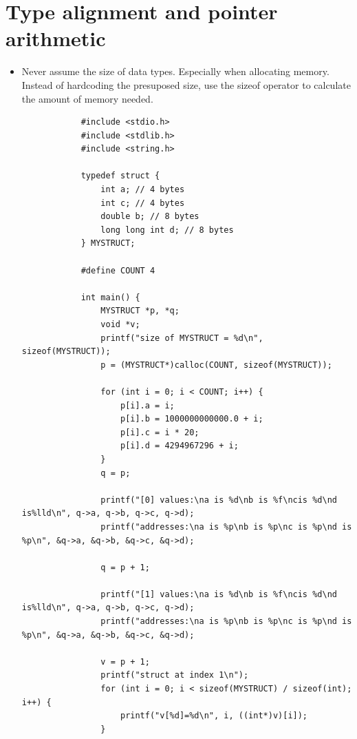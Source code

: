 \section{Type alignment and pointer arithmetic}
\begin{itemize}
    \item Never assume the size of data types. Especially when allocating memory. Instead of hardcoding the presuposed size, use the sizeof operator to calculate the amount of memory needed.
        \begin{verbatim}
            #include <stdio.h>
            #include <stdlib.h>
            #include <string.h>

            typedef struct {
                int a; // 4 bytes
                int c; // 4 bytes
                double b; // 8 bytes
                long long int d; // 8 bytes
            } MYSTRUCT;

            #define COUNT 4

            int main() {
                MYSTRUCT *p, *q;
                void *v;
                printf("size of MYSTRUCT = %d\n", sizeof(MYSTRUCT));
                p = (MYSTRUCT*)calloc(COUNT, sizeof(MYSTRUCT));
                
                for (int i = 0; i < COUNT; i++) {
                    p[i].a = i;
                    p[i].b = 1000000000000.0 + i;
                    p[i].c = i * 20;
                    p[i].d = 4294967296 + i;
                }
                q = p;

                printf("[0] values:\na is %d\nb is %f\ncis %d\nd is%lld\n", q->a, q->b, q->c, q->d);
                printf("addresses:\na is %p\nb is %p\nc is %p\nd is %p\n", &q->a, &q->b, &q->c, &q->d);

                q = p + 1;

                printf("[1] values:\na is %d\nb is %f\ncis %d\nd is%lld\n", q->a, q->b, q->c, q->d);
                printf("addresses:\na is %p\nb is %p\nc is %p\nd is %p\n", &q->a, &q->b, &q->c, &q->d);

                v = p + 1;
                printf("struct at index 1\n");
                for (int i = 0; i < sizeof(MYSTRUCT) / sizeof(int); i++) {
                    printf("v[%d]=%d\n", i, ((int*)v)[i]);
                }
                

\end{verbatim}
\end{itemize}
